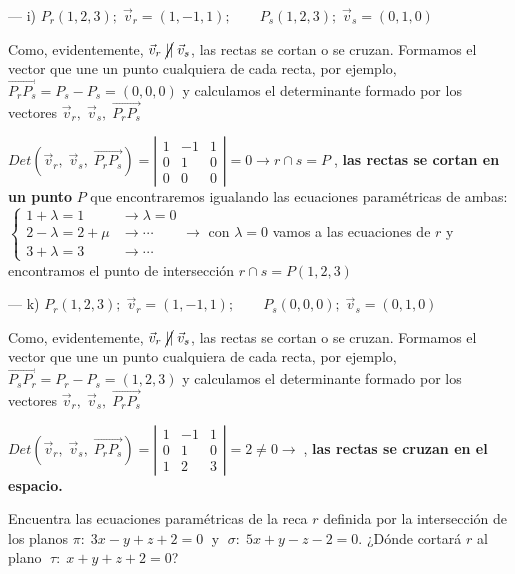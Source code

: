 \begin{proofw}
	\noindent --- i) $P_r(1,2,3); \; \vec v_r=(1,-1,1);\qquad P_s(1,2,3);\; \vec v_s=(0,1,0)$
	
	\noindent Como, evidentemente, $\vec v_r \; \cancel{||} \; \vec v_s$, las rectas se cortan o se cruzan. Formamos el vector que une un punto cualquiera de cada recta, por ejemplo, $\overrightarrow{P_rP_s}=P_s-P_s=(0,0,0)$ y calculamos el determinante formado por los vectores $\vec v_r, \; \vec v_s, \; \overrightarrow{P_rP_s}$
	
	\noindent $Det(\vec v_r, \; \vec v_s, \; \overrightarrow{P_rP_s})= \left| \begin{matrix} 1&-1&1\\0&1&0\\0&0&0 \end{matrix}\right|=0 \to r\cap s=P\;$, \textbf{las rectas se cortan en un punto} $P$ que encontraremos igualando las ecuaciones paramétricas de ambas:  \footnotesize{$\begin{cases} 1+\lambda=1 & \to \lambda =0 \\ 2-\lambda=2+\mu & \to \cdots \\ 3+\lambda = 3 & \to \cdots \end{cases} \to$} \normalsize{con} $\lambda = 0$ vamos a las ecuaciones de $r$ y encontramos el punto de intersección $r\cap s=P(1,2,3)$
	
		\noindent --- k) $P_r(1,2,3); \; \vec v_r=(1,-1,1);\qquad P_s(0,0,0);\; \vec v_s=(0,1,0)$
	
	\noindent Como, evidentemente, $\vec v_r \; \cancel{||} \; \vec v_s$, las rectas se cortan o se cruzan. Formamos el vector que une un punto cualquiera de cada recta, por ejemplo, $\overrightarrow{P_sP_r}=P_r-P_s=(1,2,3)$ y calculamos el determinante formado por los vectores $\vec v_r, \; \vec v_s, \; \overrightarrow{P_rP_s}$
	
	\noindent $Det(\vec v_r, \; \vec v_s, \; \overrightarrow{P_rP_s})= \left| \begin{matrix} 1&-1&1\\0&1&0\\1&2&3 \end{matrix}\right|=2\neq 0 \to\;$, \textbf{las rectas se cruzan en el espacio.}
	
\end{proofw}


\begin{ejre}
	Encuentra las ecuaciones paramétricas de la reca $r$ definida por la intersección de los planos $\pi:\; 3x-y+z+2=0\;$ y $\; \sigma:\; 5x+y-z-2=0$. ¿Dónde cortará $r$ al plano $\;\tau:\; x+y+z+2=0$?
\end{ejre}

